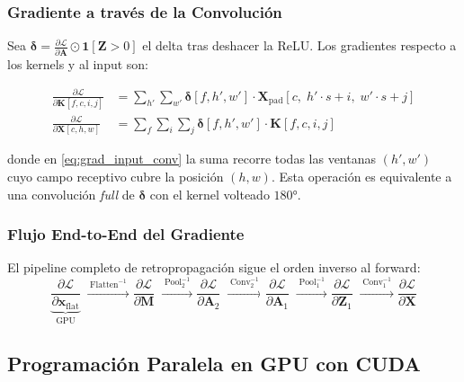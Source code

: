 \documentclass[12pt,a4paper]{article}
\begin{document}
\subsubsection{Gradiente a través de la Convolución}

Sea $\boldsymbol{\delta} = \frac{\partial \mathcal{L}}{\partial \mathbf{A}}
\odot \mathbf{1}[\mathbf{Z} > 0]$ el delta tras deshacer la ReLU.
Los gradientes respecto a los kernels y al input son:

\begin{align}
  \frac{\partial \mathcal{L}}{\partial \mathbf{K}[f,c,i,j]}
  &= \sum_{h'}\sum_{w'} \boldsymbol{\delta}[f, h', w'] \cdot
     \mathbf{X}_{\mathrm{pad}}[c,\; h' \cdot s + i,\; w' \cdot s + j]
  \label{eq:grad_kernel} \\[6pt]
  \frac{\partial \mathcal{L}}{\partial \mathbf{X}[c, h, w]}
  &= \sum_{f}\sum_{i}\sum_{j} \boldsymbol{\delta}[f, h', w'] \cdot \mathbf{K}[f, c, i, j]
  \label{eq:grad_input_conv}
\end{align}

donde en \eqref{eq:grad_input_conv} la suma recorre todas las ventanas $(h', w')$ cuyo
campo receptivo cubre la posición $(h, w)$. Esta operación es equivalente a una convolución
\textit{full} de $\boldsymbol{\delta}$ con el kernel volteado $180°$.

\subsubsection{Flujo End-to-End del Gradiente}

El pipeline completo de retropropagación sigue el orden inverso al forward:
\begin{equation}
  \underbrace{\frac{\partial \mathcal{L}}{\partial \mathbf{x}_{\mathrm{flat}}}}_{\text{GPU}}
  \;\xrightarrow{\;\mathrm{Flatten}^{-1}\;}
  \frac{\partial \mathcal{L}}{\partial \mathbf{M}}
  \;\xrightarrow{\;\mathrm{Pool}_2^{-1}\;}
  \frac{\partial \mathcal{L}}{\partial \mathbf{A}_2}
  \;\xrightarrow{\;\mathrm{Conv}_2^{-1}\;}
  \frac{\partial \mathcal{L}}{\partial \mathbf{A}_1}
  \;\xrightarrow{\;\mathrm{Pool}_1^{-1}\;}
  \frac{\partial \mathcal{L}}{\partial \mathbf{Z}_1}
  \;\xrightarrow{\;\mathrm{Conv}_1^{-1}\;}
  \frac{\partial \mathcal{L}}{\partial \mathbf{X}}
  \label{eq:gradient_flow}
\end{equation}

\subsection{Programación Paralela en GPU con CUDA}
\end{document}
